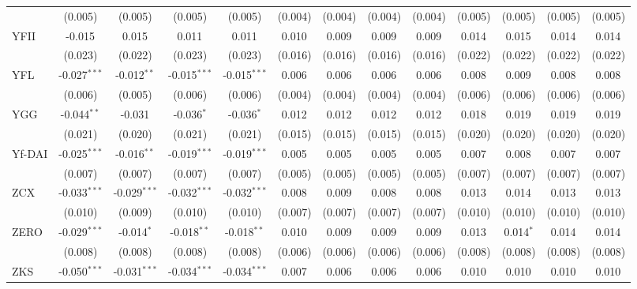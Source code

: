 \begin{table}[!htbp]
\begin{tabular}{@{\extracolsep{5pt}}lcccccccccccc}
  & (0.005) & (0.005) & (0.005) & (0.005) & (0.004) & (0.004) & (0.004) & (0.004) & (0.005) & (0.005) & (0.005) & (0.005) \\
 YFII & -0.015$^{}$ & 0.015$^{}$ & 0.011$^{}$ & 0.011$^{}$ & 0.010$^{}$ & 0.009$^{}$ & 0.009$^{}$ & 0.009$^{}$ & 0.014$^{}$ & 0.015$^{}$ & 0.014$^{}$ & 0.014$^{}$ \\
  & (0.023) & (0.022) & (0.023) & (0.023) & (0.016) & (0.016) & (0.016) & (0.016) & (0.022) & (0.022) & (0.022) & (0.022) \\
 YFL & -0.027$^{***}$ & -0.012$^{**}$ & -0.015$^{***}$ & -0.015$^{***}$ & 0.006$^{}$ & 0.006$^{}$ & 0.006$^{}$ & 0.006$^{}$ & 0.008$^{}$ & 0.009$^{}$ & 0.008$^{}$ & 0.008$^{}$ \\
  & (0.006) & (0.005) & (0.006) & (0.006) & (0.004) & (0.004) & (0.004) & (0.004) & (0.006) & (0.006) & (0.006) & (0.006) \\
 YGG & -0.044$^{**}$ & -0.031$^{}$ & -0.036$^{*}$ & -0.036$^{*}$ & 0.012$^{}$ & 0.012$^{}$ & 0.012$^{}$ & 0.012$^{}$ & 0.018$^{}$ & 0.019$^{}$ & 0.019$^{}$ & 0.019$^{}$ \\
  & (0.021) & (0.020) & (0.021) & (0.021) & (0.015) & (0.015) & (0.015) & (0.015) & (0.020) & (0.020) & (0.020) & (0.020) \\
 Yf-DAI & -0.025$^{***}$ & -0.016$^{**}$ & -0.019$^{***}$ & -0.019$^{***}$ & 0.005$^{}$ & 0.005$^{}$ & 0.005$^{}$ & 0.005$^{}$ & 0.007$^{}$ & 0.008$^{}$ & 0.007$^{}$ & 0.007$^{}$ \\
  & (0.007) & (0.007) & (0.007) & (0.007) & (0.005) & (0.005) & (0.005) & (0.005) & (0.007) & (0.007) & (0.007) & (0.007) \\
 ZCX & -0.033$^{***}$ & -0.029$^{***}$ & -0.032$^{***}$ & -0.032$^{***}$ & 0.008$^{}$ & 0.009$^{}$ & 0.008$^{}$ & 0.008$^{}$ & 0.013$^{}$ & 0.014$^{}$ & 0.013$^{}$ & 0.013$^{}$ \\
  & (0.010) & (0.009) & (0.010) & (0.010) & (0.007) & (0.007) & (0.007) & (0.007) & (0.010) & (0.010) & (0.010) & (0.010) \\
 ZERO & -0.029$^{***}$ & -0.014$^{*}$ & -0.018$^{**}$ & -0.018$^{**}$ & 0.010$^{}$ & 0.009$^{}$ & 0.009$^{}$ & 0.009$^{}$ & 0.013$^{}$ & 0.014$^{*}$ & 0.014$^{}$ & 0.014$^{}$ \\
  & (0.008) & (0.008) & (0.008) & (0.008) & (0.006) & (0.006) & (0.006) & (0.006) & (0.008) & (0.008) & (0.008) & (0.008) \\
 ZKS & -0.050$^{***}$ & -0.031$^{***}$ & -0.034$^{***}$ & -0.034$^{***}$ & 0.007$^{}$ & 0.006$^{}$ & 0.006$^{}$ & 0.006$^{}$ & 0.010$^{}$ & 0.010$^{}$ & 0.010$^{}$ & 0.010$^{}$ \\

\end{tabular}
\end{table}
